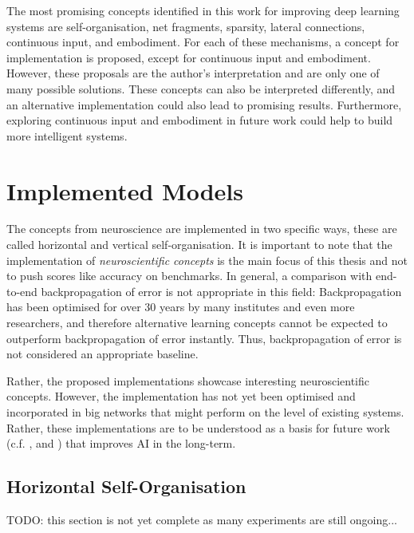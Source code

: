 The most promising concepts identified in this work for improving deep learning systems are self-organisation, net fragments, sparsity, lateral connections, continuous input, and embodiment. For each of these mechanisms, a concept for implementation is proposed, except for continuous input and embodiment. However, these proposals are the author's interpretation and are only one of many possible solutions. These concepts can also be interpreted differently, and an alternative implementation could also lead to promising results. Furthermore, exploring continuous input and embodiment in future work could help to build more intelligent systems. 


\section{Implemented Models}
The concepts from neuroscience are implemented in two specific ways, these are called horizontal and vertical self-organisation. It is important to note that the implementation of \emph{neuroscientific concepts} is the main focus of this thesis and not to push scores like accuracy on benchmarks. In general, a comparison with end-to-end backpropagation of error is not appropriate in this field: Backpropagation has been optimised for over 30 years by many institutes and even more researchers, and therefore alternative learning concepts cannot be expected to outperform backpropagation of error instantly. Thus, backpropagation of error is not considered an appropriate baseline.

Rather, the proposed implementations showcase interesting neuroscientific concepts. However, the implementation has not yet been optimised and incorporated in big networks that might perform on the level of existing systems. Rather, these implementations are to be understood as a basis for future work (c.f. ,  and ) that improves AI in the long-term.


\subsection{Horizontal Self-Organisation}
TODO: this section is not yet complete as many experiments are still ongoing...

